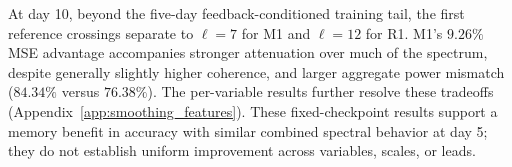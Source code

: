 \documentclass{article}
\newcommand{\vfourchange}[1]{{\color{blue}#1}}
\newcommand{\vfourred}[1]{{\color{red}#1}}
\newif\ifvfivechanges
\newcommand{\vfiveidentity}[1]{#1}
\DeclareRobustCommand{\vfiveadded}[1]{\ifvfivechanges{\color{vfiveAdded}%
  \let\vfourchange\vfiveidentity\let\vfourred\vfiveidentity#1}\else{\color{blue}%
  \let\vfourchange\vfiveidentity\let\vfourred\vfiveidentity#1}\fi}
\DeclareRobustCommand{\vfiveRone}[1]{\ifvfivechanges{\color{vfiveDeleted}\sout{#1}}\,\fi\vfiveadded{R1}}
\begin{document}
\vfiveadded{At day 10, beyond the five-day feedback-conditioned training tail, the first reference crossings separate to $\ell=7$ for M1 and $\ell=12$ for \vfourchange{R1}. M1's $9.26\%$ MSE advantage accompanies stronger attenuation over much of the spectrum, despite generally slightly higher coherence, and larger aggregate power mismatch ($84.34\%$ versus $76.38\%$). The per-variable results further resolve these tradeoffs (Appendix~\ref{app:smoothing_features}). These fixed-checkpoint results support a memory benefit in accuracy with similar combined spectral behavior at day 5; they do not establish uniform improvement across variables, scales, or leads.}
\end{document}
